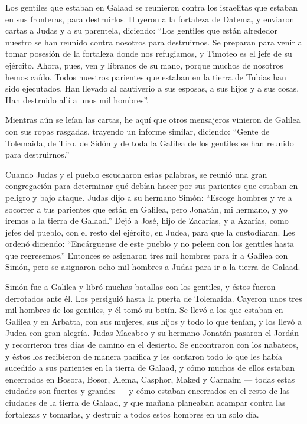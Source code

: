  Los gentiles que estaban en Galaad se reunieron contra
los israelitas que estaban en sus fronteras, para destruirlos. Huyeron a
la fortaleza de Datema,  y enviaron cartas a Judas y a su
parentela, diciendo: ``Los gentiles que están alrededor nuestro se han
reunido contra nosotros para destruirnos.  Se preparan
para venir a tomar posesión de la fortaleza donde nos refugiamos, y
Timoteo es el jefe de su ejército.  Ahora, pues, ven y
líbranos de su mano, porque muchos de nosotros hemos caído.
 Todos nuestros parientes que estaban en la tierra de
Tubias han sido ejecutados. Han llevado al cautiverio a sus esposas, a
sus hijos y a sus cosas. Han destruido allí a unos mil hombres''.

 Mientras aún se leían las cartas, he aquí que otros
mensajeros vinieron de Galilea con sus ropas rasgadas, trayendo un
informe similar,  diciendo: ``Gente de Tolemaida, de
Tiro, de Sidón y de toda la Galilea de los gentiles se han reunido para
destruirnos.''

 Cuando Judas y el pueblo escucharon estas palabras, se
reunió una gran congregación para determinar qué debían hacer por sus
parientes que estaban en peligro y bajo ataque.  Judas
dijo a su hermano Simón: ``Escoge hombres y ve a socorrer a tus
parientes que están en Galilea, pero Jonatán, mi hermano, y yo iremos a
la tierra de Galaad.''  Dejó a José, hijo de Zacarías, y
a Azarías, como jefes del pueblo, con el resto del ejército, en Judea,
para que la custodiaran.  Les ordenó diciendo:
``Encárguense de este pueblo y no peleen con los gentiles hasta que
regresemos.''  Entonces se asignaron tres mil hombres
para ir a Galilea con Simón, pero se asignaron ocho mil hombres a Judas
para ir a la tierra de Galaad.

 Simón fue a Galilea y libró muchas batallas con los
gentiles, y éstos fueron derrotados ante él.  Los
persiguió hasta la puerta de Tolemaida. Cayeron unos tres mil hombres de
los gentiles, y él tomó su botín.  Se llevó a los que
estaban en Galilea y en Arbatta, con sus mujeres, sus hijos y todo lo
que tenían, y los llevó a Judea con gran alegría.  Judas
Macabeo y su hermano Jonatán pasaron el Jordán y recorrieron tres días
de camino en el desierto.  Se encontraron con los
nabateos, y éstos los recibieron de manera pacífica y les contaron todo
lo que les había sucedido a sus parientes en la tierra de Galaad,
 y cómo muchos de ellos estaban encerrados en Bosora,
Bosor, Alema, Casphor, Maked y Carnaim --- todas estas ciudades son
fuertes y grandes ---  y cómo estaban encerrados en el
resto de las ciudades de la tierra de Galaad, y que mañana planeaban
acampar contra las fortalezas y tomarlas, y destruir a todos estos
hombres en un solo día.

